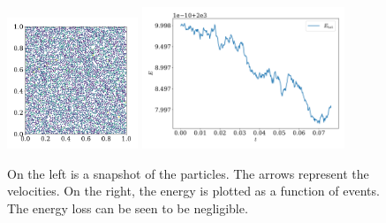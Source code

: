 \documentclass{article}
\begin{document}
        \begin{figure}
            \centering
            \includegraphics[width=0.35\textwidth]{../plots/test_case_many_particles/test_case_many_particles.pdf}
            \includegraphics[width=0.54\textwidth]{../plots/test_case_many_particles/energy.pdf}
            \caption{On the left is a snapshot of the particles. The arrows represent the velocities. On the right, the energy is plotted as a function of events. The energy loss can be seen to be negligible.}
        \end{figure}
\end{document}
